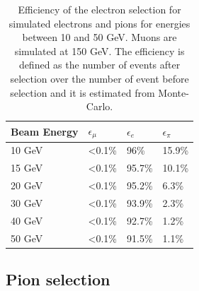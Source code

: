 \documentclass{JINST}
\begin{document}
\begin{table}[htb!]
	\centering
	\caption{Efficiency of the electron selection for simulated electrons and pions for energies between 10 and 50 GeV. Muons are simulated at 150 GeV. The efficiency is defined as the number of events after selection over the number of event before selection and it is estimated from Monte-Carlo.}
	\label{table:eff_electron}
	\begin{tabular}{@{} llll @{}}
		\toprule
		\textbf{Beam Energy} & \textbf{$\epsilon_{\mu}$} & \textbf{$\epsilon_{e}$} & \textbf{$\epsilon_{\pi}$}\\
		\midrule
		10 GeV & <0.1\% & 96\% & 15.9\%\\
		15 GeV & <0.1\% & 95.7\% & 10.1\%\\
		20 GeV & <0.1\% & 95.2\% & 6.3\%\\
		30 GeV & <0.1\% & 93.9\% & 2.3\%\\
		40 GeV & <0.1\% & 92.7\% & 1.2\%\\
		50 GeV & <0.1\% & 91.5\% & 1.1\%\\
		\bottomrule
	\end{tabular}
\end{table}

\subsection{Pion selection}
\label{sec:pionsel}
\end{document}

